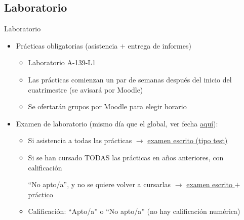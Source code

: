 \documentclass[aspectratio=169, usenames,svgnames,dvipsnames]{beamer}
\begin{document}

\subsection*{Laboratorio}

\begin{frame}{Laboratorio}


    \vspace{3mm}
    
    \begin{itemize}
        \item \alert{Prácticas obligatorias} (asistencia $+$ entrega de informes)
        \vspace{1mm}
        \begin{itemize}
            \item 
            {\normalsize Laboratorio A-139-L1}
            \vspace{2mm}
            \item {\normalsize Las prácticas comienzan un par de semanas después del inicio del cuatrimestre (se avisará por Moodle)}
            \vspace{2mm}
            \item {\normalsize Se ofertarán grupos por Moodle para elegir horario}
            \end{itemize}
        
        \vspace{2.5mm}
        \item \alert{Examen de laboratorio} (mismo día que el global, ver fecha \href{https://www.etsidi.upm.es/Estudiantes/AgendaAcademica/AAFechaExamenes}{aquí}):
        \vspace{1mm}
            \begin{itemize}           
            \item {\normalsize Si \alert{asistencia a todas las prácticas} $\rightarrow$ \underline{examen escrito (tipo test)}}
            \vspace{2mm}
            \item {\normalsize Si \alert{se han cursado TODAS las prácticas} en años anteriores, con calificación 
            
            ``No apto/a'', y no se quiere volver a cursarlas $\rightarrow$ \underline{examen escrito $+$ práctico}}
            \vspace{2mm}
            \item {\normalsize Calificación: ``\alert{Apto/a}'' o ``\alert{No apto/a}'' (no hay calificación numérica)}
            \end{itemize}
            \vspace{-4mm}
        \end{itemize}    
    

\end{frame}
\end{document}
